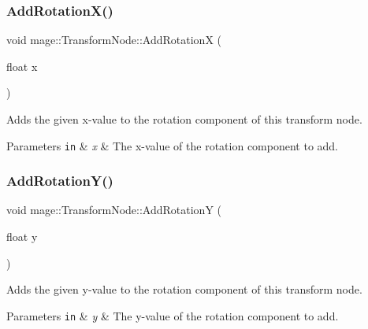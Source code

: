 \subsubsection{\texorpdfstring{Add\+Rotation\+X()}{AddRotationX()}}
{\footnotesize\ttfamily void mage\+::\+Transform\+Node\+::\+Add\+RotationX (\begin{DoxyParamCaption}\item[{float}]{x }\end{DoxyParamCaption})\hspace{0.3cm}{\ttfamily [noexcept]}}

Adds the given x-\/value to the rotation component of this transform node.


\begin{DoxyParams}[1]{Parameters}
\mbox{\tt in}  & {\em x} & The x-\/value of the rotation component to add. \\
\hline
\end{DoxyParams}
\hypertarget{structmage_1_1_transform_node_a773d43d9237a57c15b05968b00f1f0ca}{}\label{structmage_1_1_transform_node_a773d43d9237a57c15b05968b00f1f0ca} 
\subsubsection{\texorpdfstring{Add\+Rotation\+Y()}{AddRotationY()}}
{\footnotesize\ttfamily void mage\+::\+Transform\+Node\+::\+Add\+RotationY (\begin{DoxyParamCaption}\item[{float}]{y }\end{DoxyParamCaption})\hspace{0.3cm}{\ttfamily [noexcept]}}

Adds the given y-\/value to the rotation component of this transform node.


\begin{DoxyParams}[1]{Parameters}
\mbox{\tt in}  & {\em y} & The y-\/value of the rotation component to add. \\
\hline
\end{DoxyParams}
\hypertarget{structmage_1_1_transform_node_a42fd06a7b5e84efbdf9d8aee8cef64c1}{}\label{structmage_1_1_transform_node_a42fd06a7b5e84efbdf9d8aee8cef64c1} 
